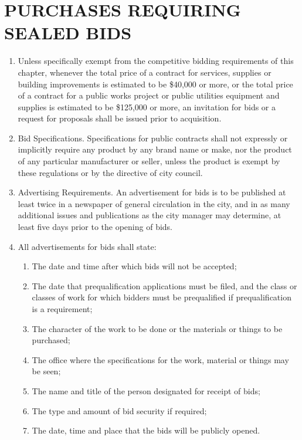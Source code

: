 \section{PURCHASES REQUIRING SEALED BIDS}
\begin{enumerate}
	\item Unless specifically exempt from the competitive bidding requirements of this chapter, whenever the total price of a contract for services, supplies or building improvements is estimated to be \$40,000 or more, or the total price of a contract for a public works project or public utilities equipment and supplies is estimated to be \$125,000 or more, an invitation for bids or a request for proposals shall be issued prior to acquisition. 
	\item Bid Specifications. Specifications for public contracts shall not expressly or implicitly require any product by any brand name or make, nor the product of any particular manufacturer or seller, unless the product is exempt by these regulations or by the directive of city council. 
	\item Advertising Requirements. An advertisement for bids is to be published at least twice in a newspaper of general circulation in the city, and in as many additional issues and publications as the city manager may determine, at least five days prior to the opening of bids. 
	\item All advertisements for bids shall state:
		\begin{enumerate}
			\item The date and time after which bids will not be accepted; 
			\item The date that prequalification applications must be filed, and the class or classes of work for which bidders must be prequalified if prequalification is a requirement; 
			\item The character of the work to be done or the materials or things to be purchased; 
			\item The office where the specifications for the work, material or things may be seen; 
			\item The name and title of the person designated for receipt of bids; 
			\item The type and amount of bid security if required; 
			\item The date, time and place that the bids will be publicly opened. 
		\end{enumerate}
\end{enumerate}

